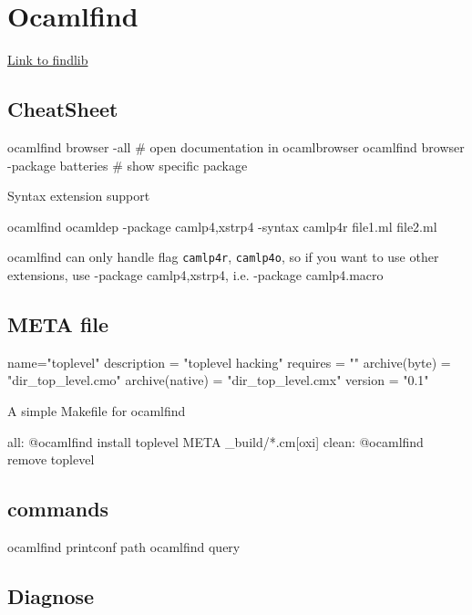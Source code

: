 \section{Ocamlfind}
\label{sec:ocamlfind}
\href{http://projects.camlcity.org/projects/dl/findlib-1.2.3/doc/ref-html/r17.html}{Link  to findlib}

\subsection{CheatSheet}

\begin{bashcode}
ocamlfind browser -all # open documentation in ocamlbrowser 
ocamlfind browser -package batteries # show specific package 
\end{bashcode}

Syntax extension support  

\begin{bashcode}
ocamlfind ocamldep -package camlp4,xstrp4 -syntax camlp4r file1.ml file2.ml 
\end{bashcode}
ocamlfind can only handle flag \verb|camlp4r|, \verb|camlp4o|, so if
you want to use other extensions, use -package camlp4,xstrp4,
i.e. -package camlp4.macro
  

\subsection{META file}

\begin{bashcode}
name="toplevel"
description = "toplevel hacking"
requires = ""
archive(byte) = "dir_top_level.cmo"
archive(native) = "dir_top_level.cmx"
version = "0.1"
\end{bashcode}


A simple Makefile for ocamlfind 

\begin{bashcode}
all:
	   @ocamlfind install toplevel META _build/*.cm[oxi]
clean: 
	   @ocamlfind remove toplevel 
\end{bashcode}

\subsection{commands}
\begin{bashcode}
  ocamlfind printconf path
  ocamlfind query 
\end{bashcode}

\subsection{Diagnose}
\label{Diagnose}

